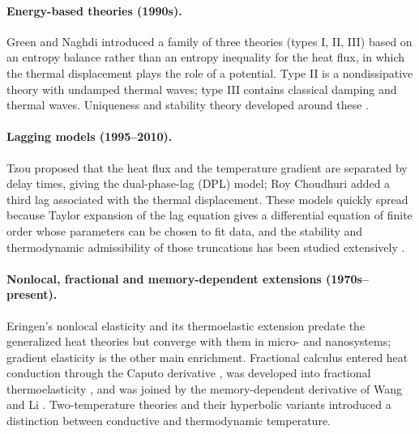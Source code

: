 \paragraph{Energy-based theories (1990s).} Green and Naghdi \citep{Green1991,GreenGN1992,Green1993} introduced a family of three theories (types I, II, III) based on an entropy balance rather than an entropy inequality for the heat flux, in which the thermal displacement plays the role of a potential. Type II is a nondissipative theory with undamped thermal waves; type III contains classical damping and thermal waves. Uniqueness and stability theory developed around these \citep{Chandrasekharaiah1996}.

\paragraph{Lagging models (1995--2010).} Tzou \citep{Tzou1995,Tzou1997} proposed that the heat flux and the temperature gradient are separated by delay times, giving the dual-phase-lag (DPL) model; Roy Choudhuri \citep{RoyChoudhuri2007} added a third lag associated with the thermal displacement. These models quickly spread because Taylor expansion of the lag equation gives a differential equation of finite order whose parameters can be chosen to fit data, and the stability and thermodynamic admissibility of those truncations has been studied extensively \citep{Quintanilla2003DPL,Chirita2016,Tibullo2017,vanDerMerwe2021}.

\paragraph{Nonlocal, fractional and memory-dependent extensions (1970s--present).} Eringen's nonlocal elasticity \citep{Eringen1972,Eringen1983,Eringen2002} and its thermoelastic extension \citep{Eringen1974} predate the generalized heat theories but converge with them in micro- and nanosystems; gradient elasticity \citep{Aifantis1992,Aifantis2003,Askes2006,Askes2011} is the other main enrichment. Fractional calculus entered heat conduction through the Caputo derivative \citep{Caputo1967}, was developed into fractional thermoelasticity \citep{Povstenko2004,Povstenko2007,Povstenko2009,Povstenko2011Cattaneo,Povstenko2016,Sherief2010Fractional,Ezzat2011}, and was joined by the memory-dependent derivative of Wang and Li \citep{Wang2011,Wang2021}. Two-temperature theories \citep{ChenGurtin1968,Youssef2006} and their hyperbolic variants \citep{Prasad2020,Alzahrani2020,Bassiouny2020} introduced a distinction between conductive and thermodynamic temperature.

